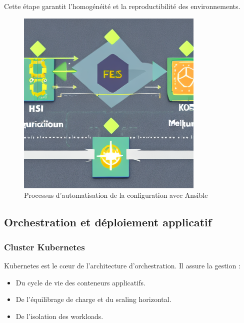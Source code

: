 Cette étape garantit l’homogénéité et la reproductibilité des environnements.

\begin{figure}[H]
	\centering
	\includegraphics[width=0.8\textwidth]{figures/ansible-configuration.png}
	\caption{Processus d'automatisation de la configuration avec Ansible}
\end{figure}

\subsection{Orchestration et déploiement applicatif}

\subsubsection*{Cluster Kubernetes}

Kubernetes est le cœur de l’architecture d’orchestration. Il assure la gestion :
\begin{itemize}
	\item Du cycle de vie des conteneurs applicatifs.
	\item De l’équilibrage de charge et du scaling horizontal.
	\item De l’isolation des workloads.
\end{itemize}

